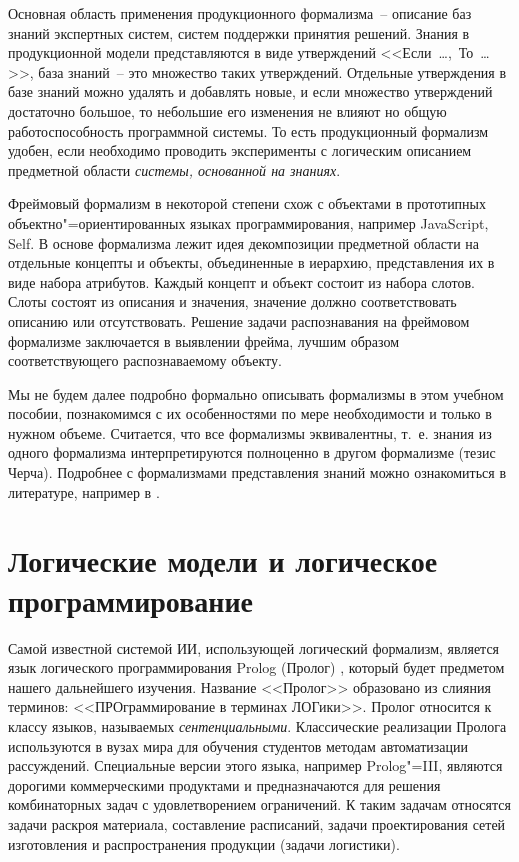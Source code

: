 \documentclass[a4paper,14pt, openany, twoside, draft]{extbook} %
\begin{document}
Основная область применения продукционного формализма~-- описание баз знаний экспертных систем, систем поддержки принятия решений.  Знания в продукционной модели представляются в виде утверждений <<Если\ \ldots{},\ То\ \ldots{}>>, база знаний~-- это множество таких утверждений.  Отдельные утверждения в базе знаний можно удалять и добавлять новые, и если множество утверждений достаточно большое, то небольшие его изменения не влияют но общую работоспособность программной системы.  То есть продукционный формализм удобен, если необходимо проводить эксперименты с логическим описанием предметной области \emph{системы, основанной на знаниях}.

Фреймовый формализм в некоторой степени схож с объектами в прототипных объектно"=ориентированных языках программирования, например JavaScript, Self.  В основе формализма лежит идея декомпозиции предметной области на отдельные концепты и объекты, объединенные в иерархию, представления их в виде набора атрибутов.  Каждый концепт и объект состоит из набора слотов.  Слоты состоят из описания и значения, значение должно соответствовать описанию или отсутствовать.  Решение задачи распознавания на фреймовом формализме заключается в выявлении фрейма, лучшим образом соответствующего распознаваемому объекту.

Мы не будем далее подробно формально описывать формализмы в этом учебном пособии, познакомимся с их особенностями по мере необходимости и только в нужном объеме.  Считается, что все формализмы эквивалентны, т.~е. знания из одного формализма интерпретируются полноценно в другом формализме (тезис Черча).  Подробнее с формализмами представления знаний можно ознакомиться в литературе, например в \cite{kompknow, dict92, myrlp}.

\chapter{Логические модели и логическое программирование}

Самой известной системой ИИ, использующей логический формализм, является язык логического программирования \foreignlanguage{english}{Prolog} (Пролог) \cite{Bratko}, который будет предметом нашего дальнейшего изучения.  Название <<Пролог>> образовано из слияния терминов: <<ПРОграммирование в терминах ЛОГики>>. Пролог относится к классу языков, называемых \emph{сентенциальными}.  Классические реализации Пролога используются в вузах мира для обучения студентов методам автоматизации рассуждений.  Специальные версии этого языка, например Prolog"=III, являются дорогими коммерческими продуктами и предназначаются для решения комбинаторных задач с удовлетворением ограничений.  К таким задачам относятся задачи раскроя материала, составление расписаний, задачи проектирования сетей изготовления и распространения продукции (задачи логистики).
\end{document}
